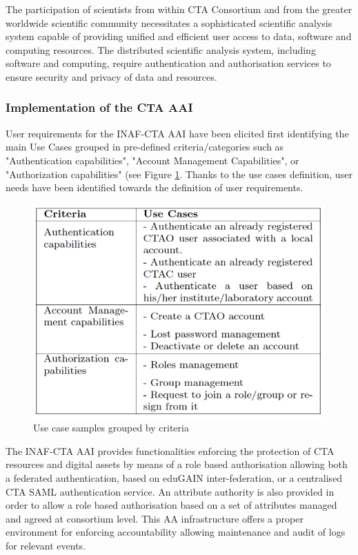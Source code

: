\documentclass[fleqn,10pt]{wlscirep}
\begin{document}
{The participation of scientists from within CTA Consortium and from the greater worldwide scientific community necessitates a sophisticated scientific analysis system capable of providing unified and efficient user access to data, software and computing resources\cite{cta-data-man}.
The distributed scientific analysis system, including software and computing, require authentication and authorisation services to ensure security and privacy of data and resources.

\subsubsection{Implementation of the CTA AAI}
User requirements for the INAF-CTA AAI have been elicited first identifying the main Use Cases grouped in pre-defined criteria/categories such as "Authentication capabilities", "Account Management Capabilities", or "Authorization capabilities" (see Figure \ref{fig:ctatable}. Thanks to the use cases definition, user needs have been identified towards the definition of user requirements.
 
\begin{figure}[ht!]
  \centering
  \includegraphics[width=0.7\columnwidth]{cta-table.png}
  \caption{Use case samples grouped by criteria}
  \label{fig:ctatable}
\end{figure}

The INAF-CTA AAI provides functionalities enforcing the protection of CTA resources and digital assets by means of a role based authorisation allowing both a federated  authentication, based on eduGAIN inter-federation, or a centralised CTA SAML authentication service. An attribute authority is also provided in order to allow a role based  authorisation based on a set of attributes managed and agreed at consortium level. This AA infrastructure offers a proper environment  for enforcing accountability  allowing  maintenance and audit of logs for relevant events.

}
\end{document}
